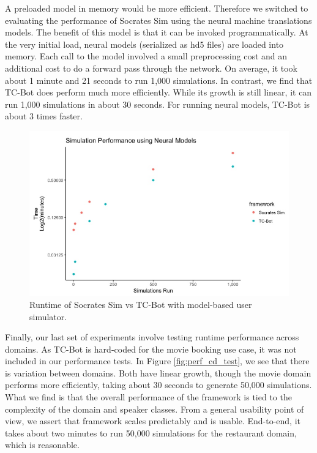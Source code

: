 A preloaded model in memory would be more efficient. Therefore we switched to evaluating the performance of Socrates Sim using the \cite{brownlee_2017} neural machine translations models. The benefit of this model is that it can be invoked programmatically. At the very initial load, neural models (serialized as hd5 files) are loaded into memory. Each call to the model involved a small preprocessing cost and an additional cost to do a forward pass through the network.  On average, it took about 1 minute and 21 seconds to run 1,000 simulations. In contrast, we find that TC-Bot does perform much more efficiently. While its growth is still linear, it can run 1,000 simulations in about 30 seconds. For running neural models, TC-Bot is about 3 times faster. 

\begin{figure}[h!]
	\centering
	\label{fig:nm_test}
	\includegraphics[width=\linewidth]{diagrams/neural_perf_test.jpeg}
	\caption{ Runtime of Socrates Sim vs TC-Bot with model-based user simulator.}
\end{figure}

 Finally, our last set of experiments involve testing runtime performance across domains. As TC-Bot is hard-coded for the movie booking use case, it was not included in our performance tests. In Figure \ref{fig:perf_cd_test}, we see that there is variation between domains. Both have linear growth, though the movie domain performs more efficiently, taking about 30 seconds to generate 50,000 simulations. What we find is that the overall performance of the framework is tied to the complexity of the domain and speaker classes. From a general usability point of view, we assert that framework scales predictably and is usable. End-to-end, it takes about two minutes to run 50,000 simulations for the restaurant domain, which is reasonable. 
 
